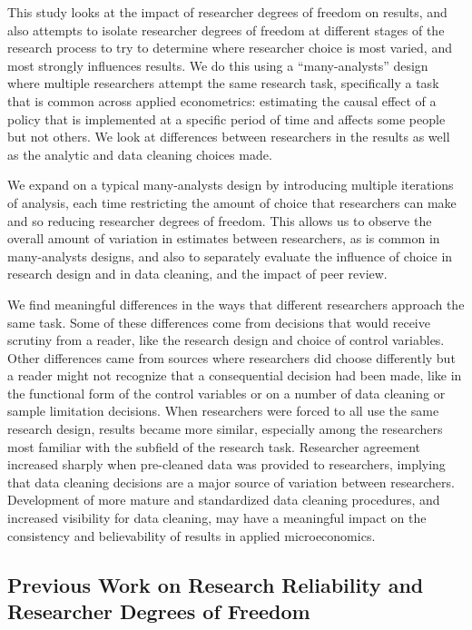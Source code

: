 \documentclass[
  letterpaper,
  DIV=11,
  numbers=noendperiod]{scrartcl}
\begin{document}
This study looks at the impact of researcher degrees of freedom on
results, and also attempts to isolate researcher degrees of freedom at
different stages of the research process to try to determine where
researcher choice is most varied, and most strongly influences results.
We do this using a ``many-analysts'' design where multiple researchers
attempt the same research task, specifically a task that is common
across applied econometrics: estimating the causal effect of a policy
that is implemented at a specific period of time and affects some people
but not others. We look at differences between researchers in the
results as well as the analytic and data cleaning choices made.

We expand on a typical many-analysts design by introducing multiple
iterations of analysis, each time restricting the amount of choice that
researchers can make and so reducing researcher degrees of freedom. This
allows us to observe the overall amount of variation in estimates
between researchers, as is common in many-analysts designs, and also to
separately evaluate the influence of choice in research design and in
data cleaning, and the impact of peer review.

We find meaningful differences in the ways that different researchers
approach the same task. Some of these differences come from decisions
that would receive scrutiny from a reader, like the research design and
choice of control variables. Other differences came from sources where
researchers did choose differently but a reader might not recognize that
a consequential decision had been made, like in the functional form of
the control variables or on a number of data cleaning or sample
limitation decisions. When researchers were forced to all use the same
research design, results became more similar, especially among the
researchers most familiar with the subfield of the research task.
Researcher agreement increased sharply when pre-cleaned data was
provided to researchers, implying that data cleaning decisions are a
major source of variation between researchers. Development of more
mature and standardized data cleaning procedures, and increased
visibility for data cleaning, may have a meaningful impact on the
consistency and believability of results in applied microeconomics.

\hypertarget{previous-work-on-research-reliability-and-researcher-degrees-of-freedom}{%
\subsection{Previous Work on Research Reliability and Researcher Degrees
of
Freedom}\label{previous-work-on-research-reliability-and-researcher-degrees-of-freedom}}
\end{document}
